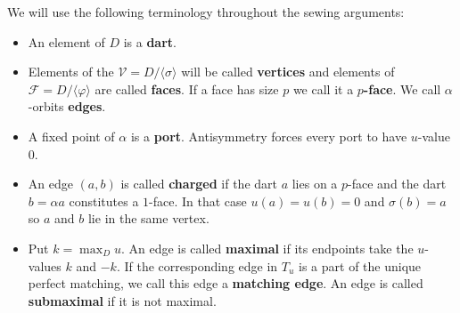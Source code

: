 \documentclass[11pt]{article}
\theoremstyle{remark}
\newcommand{\orb}[1]{[#1]_{\sigma}}
\newcommand{\cM}{\mathcal M}
\newcommand{\cF}{\mathcal F}
\newcommand{\cV}{\mathcal V}
\begin{document}
We will use the following terminology throughout the sewing arguments:

\begin{itemize}[leftmargin=2.2em]
\item An element of $D$ is a {\bf dart}.


\item Elements of the  $\cV=D/\langle\sigma\rangle$ will be called {\bf vertices} and elements of $\cF=D/\langle \varphi \rangle$ are called {\bf faces}. If a face has size $p$ we call it a {\bf $p$-face}. We call $\alpha$-orbits {\bf edges}.%

\item A fixed point of $\alpha$ is a {\bf port}.  Antisymmetry forces every
port to have $u$-value $0$.

\item An edge $(a,b)$ is called {\bf charged} if the dart $a$ lies on a $p$-face and the dart $b=\alpha a$ constitutes a $1$-face. In that case $u(a)=u(b)=0$ and $\sigma(b)=a$ so $a$ and $b$ lie in the same vertex.  


\item Put $k=\max_Du$.  An edge is called {\bf maximal} if its endpoints take the $u$-values $k$ and $-k$. If the corresponding edge in $T_u$ is a part of the unique perfect matching, we call this edge a {\bf matching edge}. An edge is called {\bf submaximal} if it is not maximal.





\end{itemize}
\end{document}

